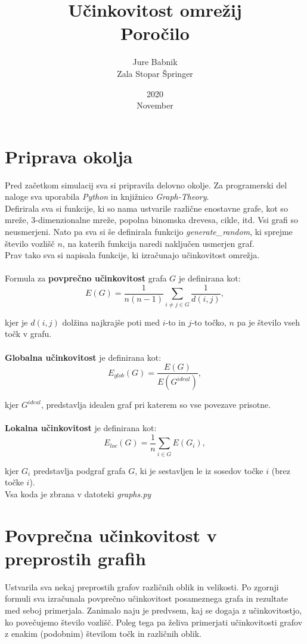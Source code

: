 \documentclass[a4paper, 16pt]{article}
\title{%
    Učinkovitost omrežij \\ 
    \large Poročilo}
\date{2020\\ November}
\author{Jure Babnik \\  Zala Stopar Špringer}
\begin{document}
\maketitle
{}


\newpage

\tableofcontents

\newpage
{}

\section{Priprava okolja}

Pred začetkom simulacij sva si pripravila delovno okolje. Za programerski del naloge sva uporabila \emph{Python}
in knjižnico \emph{Graph-Theory}.\\ 
Defirirala sva si funkcije, ki so nama ustvarile različne enostavne grafe, kot so mreže, 3-dimenzionalne mreže, 
popolna binomska drevesa, cikle, itd. Vsi grafi so neusmerjeni. Nato pa sva si še definirala funkcijo \emph{generate\_random}, 
ki sprejme število vozlišč $n$, na katerih funkcija naredi naključen usmerjen graf.\\
Prav tako sva si napisala funkcije, ki izračunajo učinkovitost omrežja. \\
\\
Formula za \textbf{povprečno učinkovitost} grafa $G$ je definirana kot:
$$ E(G) = \frac{1}{n(n-1)} \sum_{i\neq j \in G} \frac{1}{d(i,j)},$$

kjer je $d(i,j)$ dolžina najkrajše poti med $i$-to in $j$-to točko, $n$ pa je število vseh točk v grafu.\\
\\
\textbf{Globalna učinkovitost} je definirana kot:
$$ E_{glob}(G) = \frac{E(G)}{E(G^{ideal})}, $$

kjer $G^{ideal}$, predstavlja idealen graf pri katerem so vse povezave prisotne.\\
\\
\textbf{Lokalna učinkovitost} je definirana kot:
$$ E_{loc}(G) = \frac{1}{n} \sum_{i \in G} E(G_i), $$

kjer $G_i$ predstavlja podgraf grafa $G$, ki je sestavljen le iz sosedov točke $i$ (brez točke $i$). \\

Vsa koda je zbrana v datoteki \emph{graphs.py}

\newpage

\section{Povprečna učinkovitost v preprostih grafih}
Ustvarila sva nekaj preprostih grafov različnih oblik in velikosti. 
Po zgornji formuli sva izračunala povprečno učinkovitost posameznega grafa in rezultate med seboj primerjala.
Zanimalo naju je predvsem, kaj se dogaja z učinkovitostjo, ko povečujemo število vozlišč.
Poleg tega pa želiva primerjati učinkovitosti grafov z enakim (podobnim) številom točk in različnih oblik.
\end{document}

